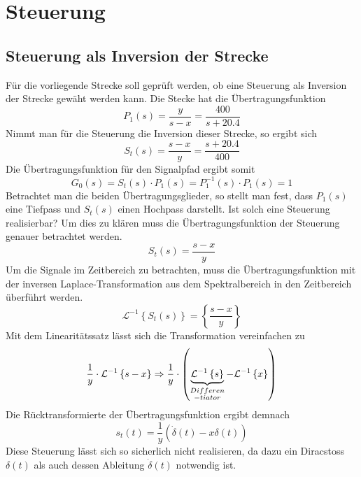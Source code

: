 \section{Steuerung}

\subsection{Steuerung als Inversion der Strecke}
Für die vorliegende Strecke soll geprüft werden, ob eine Steuerung als
Inversion der Strecke gewäht werden kann. Die Stecke hat die
Übertragungsfunktion
\[
	P_1(s) = \frac{y}{s-x} = \frac{400}{s + 20.4}
\]
Nimmt man für die Steuerung die Inversion dieser Strecke, so ergibt sich
\[
	S_t(s) = \frac{s-x}{y} = \frac{s + 20.4}{400}
\]
Die Übertragungsfunktion für den Signalpfad ergibt somit
\[
	G_0(s) = S_t(s) \cdot P_1(s) = P_1^{-1}(s) \cdot P_1(s) = 1
\]
Betrachtet man die beiden Übertragungsglieder, so stellt man fest, dass 
$P_1(s)$ eine Tiefpass und $S_t(s)$ einen Hochpass darstellt. Ist solch
eine Steuerung realisierbar? Um dies zu klären muss die Übertragungsfunktion
der Steuerung genauer betrachtet werden.
\[
	S_t(s) = \frac{s-x}{y}
\]
Um die Signale im Zeitbereich zu betrachten, muss die Übertragungsfunktion
mit der inversen Laplace-Transformation aus dem Spektralbereich in den
Zeitbereich überführt werden.
\[
	\mathcal{L}^{-1} \left\{ S_t(s) \right\}
	= \left\{ \frac{s-x}{y} \right\}
\]
Mit dem Linearitätssatz lässt sich die Transformation vereinfachen zu
\[
	\frac{1}{y} \cdot \mathcal{L}^{-1} \left\{ s-x \right\}
	\Rightarrow
	\frac{1}{y} \cdot \left(
		\underbrace{\mathcal{L}^{-1} \left\{ s \right\}}_{
			\begin{subarray}{c}Differen\\-tiator\end{subarray}}
		- \mathcal{L}^{-1} \left\{ x \right\}
	\right)
\]
Die Rücktransformierte der Übertragungsfunktion ergibt demnach
\[
	s_t(t) = \frac{1}{y} \left( \dot\delta(t) - x\delta(t) \right)
\]
Diese Steuerung lässt sich so sicherlich nicht realisieren, da dazu ein
Diracstoss $\delta(t)$ als auch dessen Ableitung $\dot\delta(t)$ notwendig
ist.
